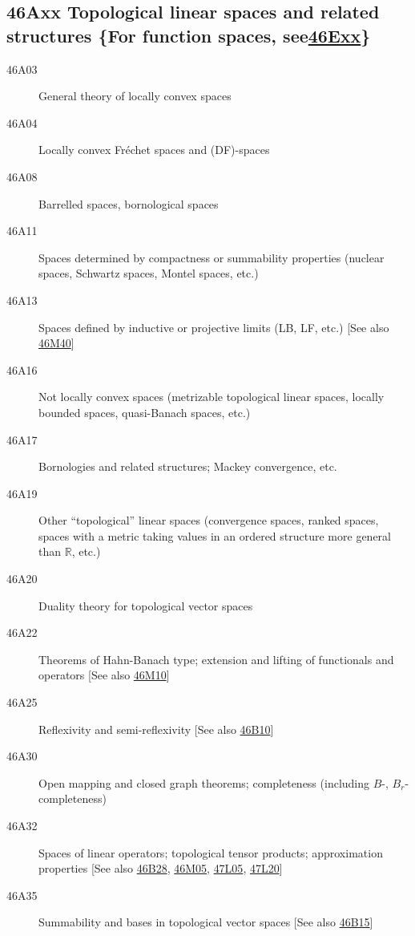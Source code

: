 \subsection*{46Axx  Topological linear spaces and related structures \{For function spaces, see\newline \hyperref[46Exx]{46Exx}\} }\label{46Axx}
\begin{description}
\item [46A03]\label{46A03} General theory of locally convex spaces
\item [46A04]\label{46A04} Locally convex Fr\'{e}chet spaces and (DF)-spaces
\item [46A08]\label{46A08} Barrelled spaces, bornological spaces
\item [46A11]\label{46A11} Spaces determined by compactness or summability properties (nuclear spaces, Schwartz spaces, Montel spaces, etc.)
\item [46A13]\label{46A13} Spaces defined by inductive or projective limits (LB, LF, etc.) [See also \hyperref[46M40]{46M40}]
\item [46A16]\label{46A16} Not locally convex spaces (metrizable topological linear spaces, locally bounded spaces, quasi-Banach spaces, etc.)
\item [46A17]\label{46A17} Bornologies and related structures; Mackey convergence, etc.
\item [46A19]\label{46A19} Other ``topological'' linear spaces (convergence spaces, ranked spaces, spaces with a metric taking values in an ordered structure more general than $\mathbb{R}$, etc.)
\item [46A20]\label{46A20} Duality theory  for topological vector spaces
\item [46A22]\label{46A22} Theorems of Hahn-Banach type; extension and lifting of functionals and operators [See also \hyperref[46M10]{46M10}]
\item [46A25]\label{46A25} Reflexivity and semi-reflexivity [See also \hyperref[46B10]{46B10}]
\item [46A30]\label{46A30} Open mapping and closed graph theorems; completeness (including $B$-, $B_r$-completeness)
\item [46A32]\label{46A32} Spaces of linear operators; topological tensor products; approximation properties [See also \hyperref[46B28]{46B28}, \hyperref[46M05]{46M05}, \hyperref[47L05]{47L05}, \hyperref[47L20]{47L20}]
\item [46A35]\label{46A35} Summability and bases in topological vector spaces [See also \hyperref[46B15]{46B15}]

\end{description}
